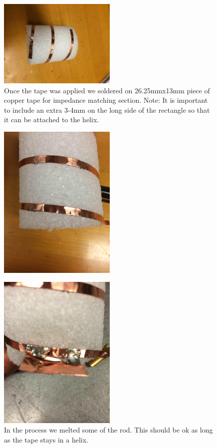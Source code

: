 \documentclass[11pt]{article} %
\begin{document}
\begin{figure}
  \centering
  \caption{ Once the tape was applied we soldered on 26.25mmx13mm piece of copper tape for impedance matching section. Note: It is important to include an extra 3-4mm on the long side of the rectangle so that it can be attached to the helix.  }
  \includegraphics[width=0.50\textwidth]{feed/11.jpeg}
\end{figure}



\begin{figure}
  \centering
  \caption{   }
  \includegraphics[width=0.50\textwidth]{feed/12.jpeg}
\end{figure}


\begin{figure}
  \centering
  \caption{ In the process we melted some of the rod. This should be ok as long as the tape stays in a helix.   }
  \includegraphics[width=0.50\textwidth]{feed/13.jpeg}
\end{figure}
\end{document}
